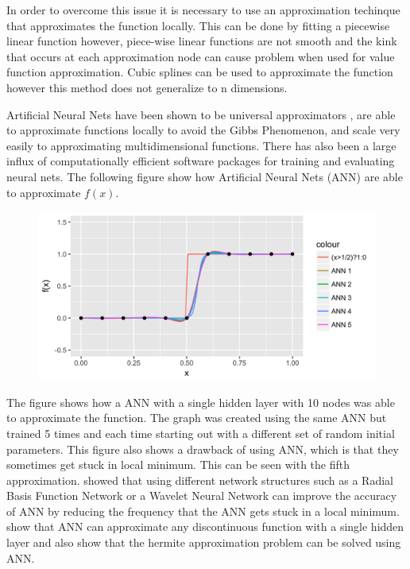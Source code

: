 \documentclass[12pt]{article}
\begin{document}
In order to overcome this issue it is necessary to use an approximation techinque that approximates the function locally. This can be done by fitting a piecewise linear function however, piece-wise linear functions are not smooth and the kink that occurs at each approximation node can cause problem when used for value function approximation. Cubic splines can be used to approximate the function however this method does not generalize to n dimensions.

Artificial Neural Nets have been shown to be universal approximators %
, are able to approximate functions locally to avoid the Gibbs Phenomenon, and scale very easily to approximating multidimensional functions. There has also been a large influx of computationally efficient software packages for training and evaluating neural nets. The following figure show how Artificial Neural Nets (ANN) are able to approximate $f(x)$.

\begin{figure}[H]
  \centering
  \includegraphics[scale=1]{plot_ANN_Ind_Func}
\end{figure}

The figure shows how a ANN with a single hidden layer with 10 nodes was able to approximate the function. The graph was created using the same ANN but trained 5 times and each time starting out with a different set of random initial parameters. This figure also shows a drawback of using ANN, which is that they sometimes get stuck in local minimum. This can be seen with the fifth approximation. %
showed that using different network structures such as a Radial Basis Function Network or a Wavelet Neural Network can improve the accuracy of ANN by reducing the frequency that the ANN gets stuck in a local minimum. %
show that ANN can approximate any discontinuous function with a single hidden layer and  %
also show that the hermite approximation problem can be solved using ANN.
\end{document}
